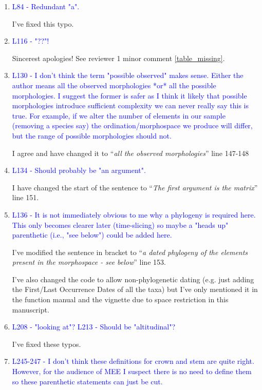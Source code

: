 \documentclass[12pt,letterpaper]{article}
\begin{document}
\begin{enumerate}
\item{\textcolor{blue}{L84 - Redundant "a".}}

I've fixed this typo.

\item{\textcolor{blue}{L116 - "??"!}}

Sincerest apologies! See reviewer 1 minor comment \ref{table_missing}.

\item{\textcolor{blue}{L130 - I don't think the term "possible observed" makes sense. Either the author means all the observed morphologies *or* all the possible morphologies. I suggest the former is safer as I think it likely that possible morphologies introduce sufficient complexity we can never really say this is true. For example, if we alter the number of elements in our sample (removing a species say) the ordination/morphospace we produce will differ, but the range of possible morphologies should not.}}

I agree and have changed it to ``\textit{all the observed morphologies}'' line 147-148

\item{\textcolor{blue}{L134 - Should probably be "an argument".}}

I have changed the start of the sentence to ``\textit{The first argument is the matrix}'' line 151.

\item{\textcolor{blue}{L136 - It is not immediately obvious to me why a phylogeny is required here. This only becomes clearer later (time-slicing) so maybe a "heads up" parenthetic (i.e., "see below") could be added here.}}

I've modified the sentence in bracket to
``\textit{a dated phylogeny of the elements present in the morphospace - see below}'' line 153.

I've also changed the code to allow non-phylogenetic dating (e.g. just adding the First/Last Occurrence Dates of all the taxa) but I've only mentioned it in the function manual and the vignette due to space restriction in this manuscript.

\item{\textcolor{blue}{L208 - "looking at"? L213 - Should be "altitudinal"?}}
\label{altitude}

I've fixed these typos.

\item{\textcolor{blue}{L245-247 - I don't think these definitions for crown and stem are quite right. However, for the audience of MEE I suspect there is no need to define them so these parenthetic statements can just be cut.}}


\end{enumerate}
\end{document}
